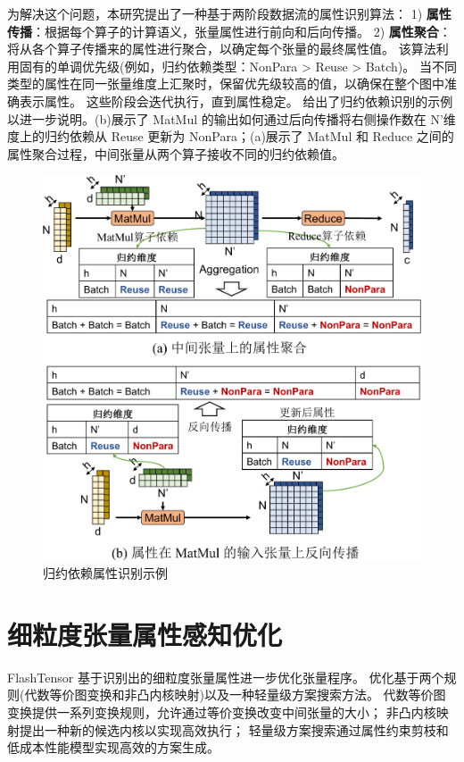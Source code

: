 为解决这个问题，本研究提出了一种基于两阶段数据流的属性识别算法：
1) \textbf{属性传播}：根据每个算子的计算语义，张量属性进行前向和后向传播。
2) \textbf{属性聚合}：将从各个算子传播来的属性进行聚合，以确定每个张量的最终属性值。
该算法利用固有的单调优先级(例如，归约依赖类型：NonPara > Reuse > Batch)。
当不同类型的属性在同一张量维度上汇聚时，保留优先级较高的值，以确保在整个图中准确表示属性。
这些阶段会迭代执行，直到属性稳定。
给出了归约依赖识别的示例以进一步说明。(b)展示了 MatMul 的输出如何通过后向传播将右侧操作数在 N’维度上的归约依赖从 Reuse 更新为 NonPara；(a)展示了 MatMul 和 Reduce 之间的属性聚合过程，中间张量从两个算子接收不同的归约依赖值。

\begin{figure}[ht]
    \centering
    \includegraphics[width=0.7\linewidth]{figures/flashtensor/identification_merge-crop.pdf}
    \caption{归约依赖属性识别示例}
    \label{fig:identification_merge}
\end{figure}

\section{细粒度张量属性感知优化}
FlashTensor 基于识别出的细粒度张量属性进一步优化张量程序。
优化基于两个规则(代数等价图变换和非凸内核映射)以及一种轻量级方案搜索方法。
代数等价图变换提供一系列变换规则，允许通过等价变换改变中间张量的大小；
非凸内核映射提出一种新的候选内核以实现高效执行；
轻量级方案搜索通过属性约束剪枝和低成本性能模型实现高效的方案生成。

